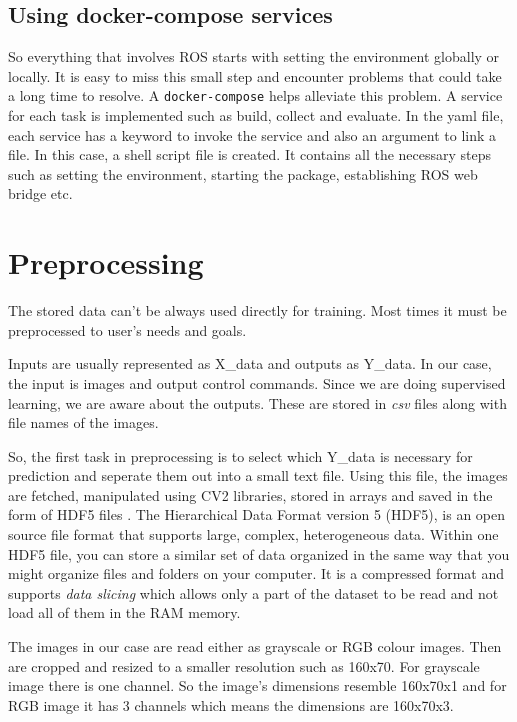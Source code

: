 \subsection{Using docker-compose services}
So everything that involves ROS starts with setting the environment globally or locally.
It is easy to miss this small step and encounter problems that could take a long time to
resolve. A \texttt{docker-compose} helps alleviate this problem. A service for each task
is implemented such as build, collect and evaluate. In the yaml file, each service has a
keyword to invoke the service and also an argument to link a file. In this case, a
shell script file is created. It contains all the necessary steps
such as setting the environment, starting the package, establishing ROS web bridge etc.

\section{Preprocessing}
The stored data can't be always used directly for training. Most times it must be
preprocessed to user's needs and goals.

Inputs are usually represented as X\_{data} and outputs as Y\_{data}. In our case, the input is images and output control commands.
Since we are doing supervised learning, we are aware about the outputs. These are stored in
\textit{csv} files along with file names of the images.

So, the first task in preprocessing is to select which Y\_data is necessary for prediction
and seperate them out into a small text file. Using this file, the images are fetched,
manipulated using CV2 libraries, stored in arrays and saved in the form of HDF5 files
\cite{hdf5file}. The Hierarchical Data Format version 5 (HDF5), is an open source file format
that supports large, complex, heterogeneous data. Within one HDF5 file, you can store a similar set of data organized in the same way that you might organize files and folders on your computer.
It is a compressed format and supports \textit{data slicing} which allows only a part of
the dataset to be read and not load all of them in the RAM memory.

The images in our case are read either as grayscale or RGB colour images. Then are cropped
and resized to a smaller resolution such as 160x70. For grayscale image there is one
channel. So the image's dimensions resemble 160x70x1 and for RGB image it has 3 channels
which means the dimensions are 160x70x3.

